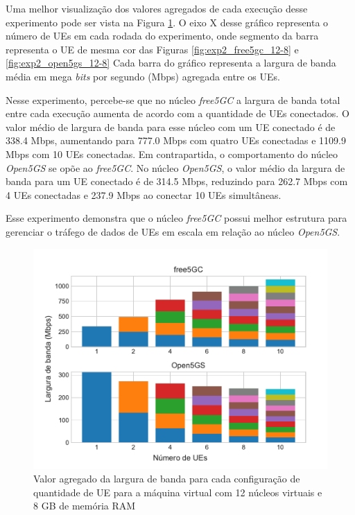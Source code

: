 Uma melhor visualização dos valores agregados de cada execução desse experimento pode ser vista na Figura \ref{fig:exp2_all_12-8}.
O eixo X desse gráfico representa o número de UEs em cada rodada do experimento, onde segmento da barra representa o UE de mesma cor das Figuras \ref{fig:exp2_free5gc_12-8} e \ref{fig:exp2_open5gs_12-8}
Cada barra do gráfico representa a largura de banda média em mega \textit{bits} por segundo (Mbps) agregada entre os UEs.

Nesse experimento, percebe-se que no núcleo \textit{free5GC} a largura de banda total entre cada execução aumenta de acordo com a quantidade de UEs conectados.
O valor médio de largura de banda para esse núcleo com um UE conectado é de 338.4 Mbps, aumentando para 777.0 Mbps com quatro UEs conectadas e 1109.9 Mbps com 10 UEs conectadas.
Em contrapartida, o comportamento do núcleo \textit{Open5GS} se opõe ao \textit{free5GC}. No núcleo \textit{Open5GS}, o valor médio da largura de banda para um UE conectado é de 314.5 Mbps, reduzindo para 262.7 Mbps com 4 UEs conectadas e 237.9 Mbps ao conectar 10 UEs simultâneas.

Esse experimento demonstra que o núcleo \textit{free5GC} possui melhor estrutura para gerenciar o tráfego de dados de UEs em escala em relação ao núcleo \textit{Open5GS}.

\begin{figure}[!ht]
    \centering
    \includegraphics[width=1\textwidth]{TG2/Chapters/DataAnalysis/Figures/EXP2-ALL-12C-8GB.pdf}
    \caption{Valor agregado da largura de banda para cada configuração de quantidade de UE para a máquina virtual com 12 núcleos virtuais e 8 GB de memória RAM}
    \label{fig:exp2_all_12-8}
\end{figure}

